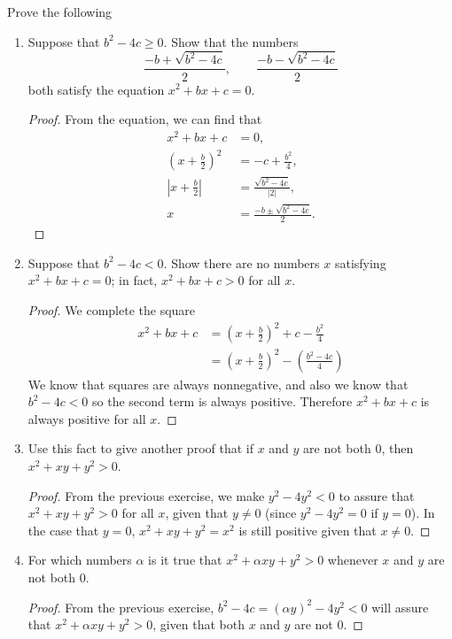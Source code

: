 \pagebreak
\begin{exercise}[\textbf{18}] Prove the following
     \begin{enumerate}
         \item Suppose that $b^2-4c \geq 0$. Show that the numbers 
         \begin{equation*}
             \frac{-b+\sqrt{b^2-4c}}{2}, \qquad \frac{-b-\sqrt{b^2-4c}}{2}
         \end{equation*}
         both satisfy the equation $x^2+bx+c=0$.
         \begin{proof} From the equation, we can find that
              \begin{align*}
                  x^2+bx+c &= 0, \\
                  \left(x+ \frac{b}{2}\right)^2 &= -c+\frac{b^2}{4}, \\
                  \left| x+\frac{b}{2} \right| &= \frac{\sqrt{b^2-4c}}{|2|}, \\
                  x &= \frac{-b\pm \sqrt{b^2-4c}}{2}.
              \end{align*}
         \end{proof}
         \item Suppose that $b^2-4c < 0$. Show there are no numbers $x$
         satisfying $x^2+bx+c=0$; in fact, $x^2+bx+c > 0$ for all $x$.
         \begin{proof} We complete the square
              \begin{align*}
                  x^2+bx+c &= \left( x+\frac{b}{2}\right)^2 + c-\frac{b^2}{4} \\
                  &= \left( x+\frac{b}{2}\right)^2-\left( \frac{b^2-4c}{4}\right)
              \end{align*}
              We know that squares are always nonnegative, and also we know that
              $b^2-4c <0$ so the second term is always positive. Therefore
              $x^2+bx+c$ is always positive for all $x$.
         \end{proof}
     \item Use this fact to give another proof that if $x$ and $y$ are not both
     $0$, then $x^2+xy+y^2>0$.
     \begin{proof} From the previous exercise, we make $y^2-4y^2<0$ to assure
     that $x^2+xy+y^2 >0$ for all $x$, given that $y\neq 0$ (since $y^2-4y^2 =
     0$ if $y=0$). In the case that $y=0$, $x^2+xy+y^2 = x^2$ is still positive given
     that $x\neq 0$.          
     \end{proof}
     \pagebreak
    \item For which numbers $\alpha $ is it true that $x^2+\alpha xy+y^2 >0$
    whenever $x$ and $y$ are not both $0$.
    \begin{proof} From the previous exercise, $b^2-4c = (\alpha y)^2-4y^2 <0$
    will assure that $x^2+\alpha xy+y^2 >0$, given that both $x$ and $y$ are not
    $0$. 


\end{proof}
\end{enumerate}
\end{exercise}
